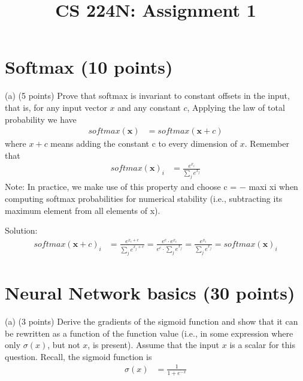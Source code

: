 \documentclass[12pt]{article}
\title{CS 224N: Assignment 1}
\begin{document}
\maketitle
\section{Softmax (10 points)}

(a) (5 points) Prove that softmax is invariant to constant offsets in the input, that is,
for any input vector $x$ and any constant $c$,
Applying the law of total probability we have
\begin{align*}
softmax(\mathbf{x}) &= softmax(\mathbf{x} + c)
\end{align*}
where $x + c$ means adding the constant c to every dimension of $x$.
Remember that
\begin{align*}
softmax(\mathbf{x})_{i} &= \frac{e^{x_i}}{\sum_{j} e^{x_j}}
\end{align*}
Note: In practice, we make use of this property and choose c = − maxi xi when computing softmax
probabilities for numerical stability (i.e., subtracting its maximum element from all elements of x).


Solution:
\begin{align*}
softmax(\mathbf{x} + c)_{i} &= \frac{e^{x_i + c}}{\sum_{j} e^{x_j + c}}
= \frac{e^c \cdot e^{x_i}}{e^c \cdot \sum_{j} e^{x_j}} = \frac{e^{x_i}}{\sum_{j} e^{x_j}} = softmax(\mathbf{x})_{i}
\end{align*}

\section{Neural Network basics (30 points)}
(a) (3 points) Derive the gradients of the sigmoid function and show that it can be rewritten as a function
of the function value (i.e., in some expression where only $\sigma (x)$, but not $x$, is present). Assume that the
input $x$ is a scalar for this question. Recall, the sigmoid function is
\begin{align*}
\sigma(x) &= \frac{1}{1 + e^{-x}}
\end{align*}
\end{document}
